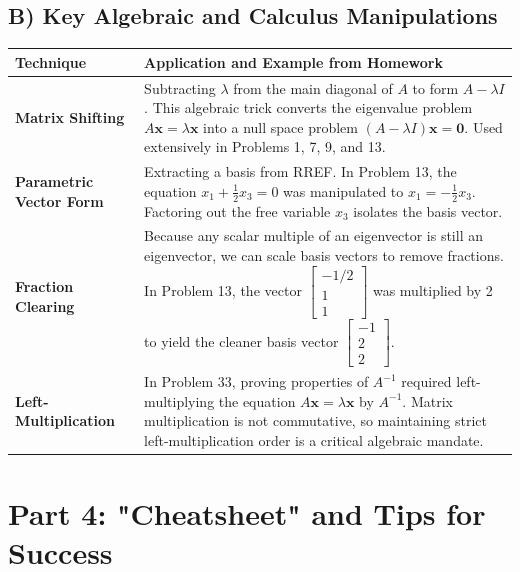 \documentclass[11pt, a4paper]{article}
\theoremstyle{definition}
\theoremstyle{remark}
\begin{document}
\subsection{B) Key Algebraic and Calculus Manipulations}

\renewcommand{\arraystretch}{1.5}
\noindent
\begin{tabularx}{\textwidth}{lX}
\toprule
\textbf{Technique} & \textbf{Application and Example from Homework} \\
\midrule
\textbf{Matrix Shifting} & 
Subtracting $\lambda$ from the main diagonal of $A$ to form $A - \lambda I$. This algebraic trick converts the eigenvalue problem $A\mathbf{x} = \lambda \mathbf{x}$ into a null space problem $(A - \lambda I)\mathbf{x} = \mathbf{0}$. Used extensively in Problems 1, 7, 9, and 13. \\
\addlinespace[4pt]
\textbf{Parametric Vector Form} & 
Extracting a basis from RREF. In Problem 13, the equation $x_1 + \frac{1}{2}x_3 = 0$ was manipulated to $x_1 = -\frac{1}{2}x_3$. Factoring out the free variable $x_3$ isolates the basis vector. \\
\addlinespace[4pt]
\textbf{Fraction Clearing} & 
Because any scalar multiple of an eigenvector is still an eigenvector, we can scale basis vectors to remove fractions. In Problem 13, the vector $\displaystyle \begin{bmatrix} -1/2 \\ 1 \\ 1 \end{bmatrix}$ was multiplied by 2 to yield the cleaner basis vector $\displaystyle \begin{bmatrix} -1 \\ 2 \\ 2 \end{bmatrix}$. \\
\addlinespace[4pt]
\textbf{Left-Multiplication} & 
In Problem 33, proving properties of $A^{-1}$ required left-multiplying the equation $A\mathbf{x} = \lambda \mathbf{x}$ by $A^{-1}$. Matrix multiplication is not commutative, so maintaining strict left-multiplication order is a critical algebraic mandate. \\
\bottomrule
\end{tabularx}

\newpage
\section{Part 4: "Cheatsheet" and Tips for Success}
\end{document}
